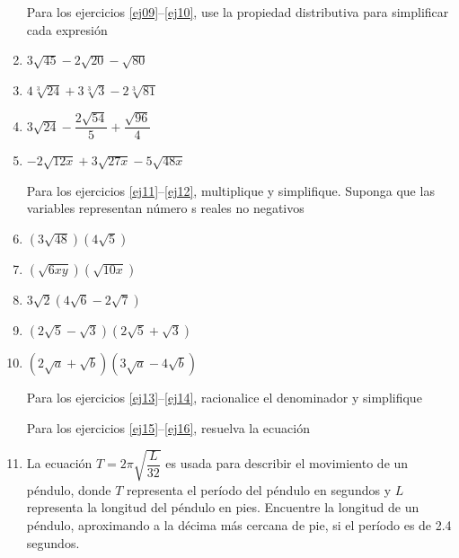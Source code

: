 \documentclass[twoside,letterpaper]{article}
\begin{document}
\begin{multicols}{2}
\begin{enumerate}
Para los ejercicios \ref{ej09}--\ref{ej10}, use la propiedad distributiva para simplificar cada expresión
\item \label{ej09} $3\sqrt{45}-2\sqrt{20}-\sqrt{80}$
\item $4\sqrt[3]{24}+3\sqrt[3]{3}-2\sqrt[3]{81}$
\item $3\sqrt{24}-\dfrac{2\sqrt{54}}{5}+\dfrac{\sqrt{96}}{4}$
\item \label{ej10} $-2\sqrt{12x}+3\sqrt{27x}-5\sqrt{48x}$

Para los ejercicios \ref{ej11}--\ref{ej12}, multiplique y simplifique. Suponga que las variables representan número s reales no negativos
\item \label{ej11} $(3\sqrt{48})(4\sqrt{5})$
\item $(\sqrt{6xy})(\sqrt{10x})$
\item $3\sqrt{2}(4\sqrt{6}-2\sqrt{7})$
\item $(2\sqrt{5}-\sqrt{3})(2\sqrt{5}+\sqrt{3})$
\item \label{ej12} $(2\sqrt{a}+\sqrt{b})(3\sqrt{a}-4\sqrt{b})$

Para los ejercicios \ref{ej13}--\ref{ej14}, racionalice el denominador y simplifique

Para los ejercicios \ref{ej15}--\ref{ej16}, resuelva la ecuación
\item La ecuación $T=2\pi\sqrt{\dfrac{L}{32}}$ es usada para describir el movimiento de un péndulo, donde $T$ representa el período del péndulo en segundos y $L$ representa la longitud del péndulo en pies. Encuentre la longitud de un péndulo, aproximando a la décima más cercana de pie, si el período es de 2.4 segundos.


\end{enumerate}
\end{multicols}
\end{document}
